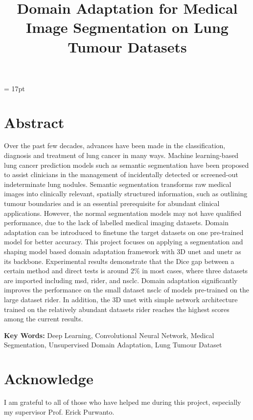 \documentclass[11pt,times,oneside,openright]{eeereport}
\title{Domain Adaptation for Medical Image Segmentation on Lung Tumour Datasets}
\subtitle{}
\begin{document}
\baselineskip = 17pt
\begin{titlepage}

\newpage
\thispagestyle{empty}
\end{titlepage}

\frontmatter

\tableofcontents
{}

\listoffigures
\listoftables

\printglossary[title=Acronyms]
\chapter{Abstract}
Over the past few decades, advances have been made in the classification, diagnosis and treatment of lung cancer in many ways. Machine learning-based lung cancer prediction models such as semantic segmentation have been proposed to assist clinicians in the management of incidentally detected or screened-out indeterminate lung nodules. Semantic segmentation transforms raw medical images into clinically relevant, spatially structured information, such as outlining tumour boundaries and is an essential prerequisite for abundant clinical applications. However, the normal segmentation models may not have qualified performance, due to the lack of labelled medical imaging datasets. Domain adaptation can be introduced to finetune the target datasets on one pre-trained model for better accuracy. This project focuses on applying a segmentation and shaping model based domain adaptation framework with 3D \acrshort{unet} and \acrshort{unetr} as its backbone. Experimental results demonstrate that the Dice gap between a certain method and direct tests is around 2\% in most cases, where three datasets are imported including \acrshort{msd}, \acrshort{rider}, and \acrshort{nsclc}. Domain adaptation significantly improves the performance on the small dataset \acrshort{nsclc} of models pre-trained on the large dataset \acrshort{rider}. In addition, the 3D \acrshort{unet} with simple network architecture trained on the relatively abundant datasets \acrshort{rider} reaches the highest scores among the current results.

\textbf{Key Words:} Deep Learning, Convolutional Neural Network, Medical Segmentation, Unsupervised Domain Adaptation, Lung Tumour Dataset

\chapter{Acknowledge}
I am grateful to all of those who have helped me during this project, especially my supervisor Prof. Erick Purwanto.
\end{document}
